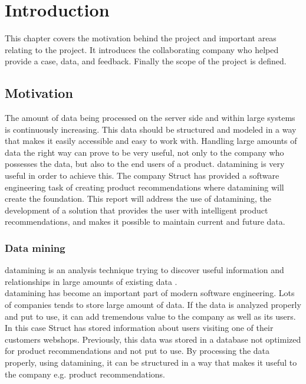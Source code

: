 
\chapter{Introduction} %

\label{ChapterX} %


This chapter covers the motivation behind the project and important areas relating to the project. It introduces the collaborating company who helped provide a case, data, and feedback. Finally the scope of the project is defined.

\section{Motivation}
The amount of data being processed on the server side and within large systems is continuously increasing. This data should be structured and modeled in a way that makes it easily accessible and easy to work with. Handling large amounts of data the right way can prove to be very useful, not only to the company who possesses the data, but also to the end users of a product. \Gls{datamining} is very useful in order to achieve this.
The company \gls{Struct} has provided a software engineering task of creating product recommendations where \gls{datamining} will create the foundation. This report will address the use of \gls{datamining}, the development of a solution that provides the user with intelligent product recommendations, and makes it possible to maintain current and future data.

\subsection{Data mining}
\gls{datamining} is an analysis technique trying to discover useful information and relationships in large amounts of existing data \cite{dataminingSource}. \\  
\gls{datamining} has become an important part of modern software engineering. Lots of companies tends to store large amount of data. If the data is analyzed properly and put to use, it can add tremendous value to the company as well as its users. In this case \gls{Struct} has stored information about users visiting one of their customers webshops. Previously, this data was stored in a database not optimized for product recommendations and not put to use. By processing the data properly, using \gls{datamining}, it can be structured in a way that makes it useful to the company e.g. product recommendations.

